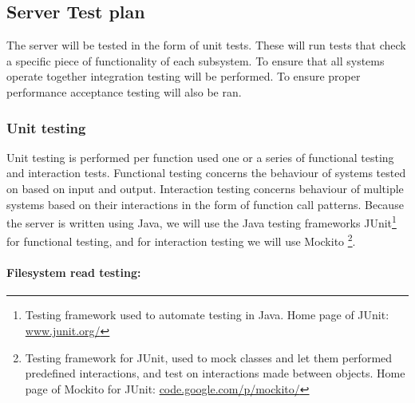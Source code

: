 \subsection{Server Test plan}
The server
will be tested in the form of unit tests. These will run tests that check a specific piece of functionality of each subsystem. To ensure that all systems operate together integration testing will be performed. To ensure proper performance acceptance testing will also be ran.
\subsubsection{Unit testing}
Unit testing is performed per function used one or a series of functional testing and interaction tests. Functional testing concerns the behaviour of systems tested on based on input and output. Interaction testing concerns behaviour of multiple systems based on their interactions in the form of function call patterns. Because the server is written using Java, we will use the Java testing frameworks JUnit\footnote{Testing framework used to automate testing in Java. Home page of JUnit: \url{www.junit.org/}} for functional testing, and for interaction testing we will use Mockito \footnote{Testing framework for JUnit, used to mock classes and let them performed predefined interactions, and test on interactions made between objects. Home page of Mockito for JUnit: \url{code.google.com/p/mockito/}}.

\paragraph{Filesystem read testing:}

